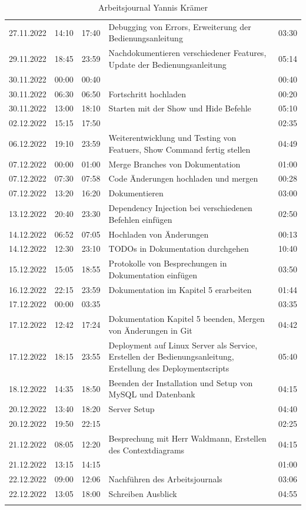 \documentclass[a4paper, table]{article}
\begin{document}
\begin{longtable}[h]{|l|l|l|p{20em}|l|}
    27.11.2022 & 14:10 & 17:40 & Debugging von Errors, Erweiterung der   Bedienungsanleitung & 03:30 \\
    29.11.2022 & 18:45 & 23:59 & Nachdokumentieren verschiedener Features, Update   der Bedienungsanleitung & 05:14 \\
    30.11.2022 & 00:00 & 00:40 &  & 00:40 \\
    30.11.2022 & 06:30 & 06:50 & Fortschritt hochladen & 00:20 \\
    30.11.2022 & 13:00 & 18:10 & Starten mit der Show und Hide Befehle & 05:10 \\
    02.12.2022 & 15:15 & 17:50 &  & 02:35 \\
    06.12.2022 & 19:10 & 23:59 & Weiterentwicklung und Testing von Featuers, Show   Command fertig stellen & 04:49 \\
    07.12.2022 & 00:00 & 01:00 & Merge Branches von   Dokumentation & 01:00 \\
    07.12.2022 & 07:30 & 07:58 & Code Änderungen hochladen und mergen & 00:28 \\
    07.12.2022 & 13:20 & 16:20 & Dokumentieren & 03:00 \\
    13.12.2022 & 20:40 & 23:30 & Dependency Injection bei verschiedenen Befehlen   einfügen & 02:50 \\
    14.12.2022 & 06:52 & 07:05 & Hochladen von Änderungen & 00:13 \\
    14.12.2022 & 12:30 & 23:10 & TODOs in Dokumentation   durchgehen & 10:40 \\
    15.12.2022 & 15:05 & 18:55 & Protokolle von Besprechungen in Dokumentation   einfügen & 03:50 \\
    16.12.2022 & 22:15 & 23:59 & Dokumentation im Kapitel   5 erarbeiten & 01:44 \\
    17.12.2022 & 00:00 & 03:35 &  & 03:35 \\
    17.12.2022 & 12:42 & 17:24 & Dokumentation Kapitel 5 beenden, Mergen von  Änderungen in Git & 04:42 \\
    17.12.2022 & 18:15 & 23:55 & Deployment auf Linux Server als Service,   Erstellen der Bedienungsanleitung, Erstellung des Deploymentscripts & 05:40 \\
    18.12.2022 & 14:35 & 18:50 & Beenden der Installation und Setup von MySQL und   Datenbank & 04:15 \\
    20.12.2022 & 13:40 & 18:20 & Server Setup & 04:40 \\
    20.12.2022 & 19:50 & 22:15 &  & 02:25 \\
    21.12.2022 & 08:05 & 12:20 & Besprechung mit Herr Waldmann, Erstellen des   Contextdiagrams & 04:15 \\
    21.12.2022 & 13:15 & 14:15 &  & 01:00 \\
    22.12.2022 & 09:00 & 12:06 & Nachführen des   Arbeitsjournals & 03:06 \\
    22.12.2022 & 13:05 & 18:00 & Schreiben Ausblick & 04:55 \\
    \hline
    \caption{Arbeitsjournal Yannis Krämer}
    \label{tab:work-journal-yannis}
\end{longtable}
\end{document}
